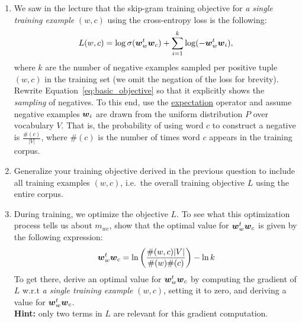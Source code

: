 \documentclass[11pt,a4paper]{article}
\begin{document}
\begin{enumerate}[label=(\alph*)]
    \item We saw in the lecture that the skip-gram training objective for
          \emph{a single training example} $(w,c)$ using the cross-entropy loss
          is the following:
          \begin{align}\label{eq:basic_objective}
              L(w,c) = \log \sigma({\boldsymbol{w}}_w^t{\boldsymbol{w}}_c) + \sum_{i=1}^k \log(-{\boldsymbol{w}}_w^t{\boldsymbol{w}}_i),
          \end{align}
          where $k$ are the number of negative examples sampled per positive
          tuple $(w,c)$ in the training set (we omit the negation of the loss
          for brevity).
          Rewrite Equation~\ref{eq:basic_objective} so that it explicitly shows
          the \emph{sampling} of negatives.
          To this end, use the
          \href{https://en.wikipedia.org/wiki/Expected_value}{\underline{expectation}}
          operator and assume negative examples ${\boldsymbol{w}}_i$ are drawn from the
          uniform distribution $P$ over vocabulary $V$.
          That is, the probability of using word $c$ to construct a negative is
          $\frac{\#(c)}{|V|}$, where $\#(c)$ is the number of times word $c$
          appears in the training corpus.
    \item Generalize your training objective derived in the previous question to
          include all training examples $(w,c)$, i.e.\ the overall training
          objective $L$ using the entire corpus.
    \item During training, we optimize the objective $L$. To see what this
          optimization process tells us about $m_{wc}$, show that the optimal
          value for ${\boldsymbol{w}}_w^t{\boldsymbol{w}}_c$ is given by the following expression:
          \begin{align}\label{eq:pmi_equality}
              {\boldsymbol{w}}_w^t{\boldsymbol{w}}_c = \ln\left(\frac{\#(w,c) |V|}{\#(w) \#(c)}\right) - \ln k
          \end{align}
          To get there, derive an optimal value for ${\boldsymbol{w}}_w^t{\boldsymbol{w}}_c$ by computing
          the gradient of $L$ w.r.t \emph{a single training example} $(w,c)$,
          setting it to zero, and deriving a value for ${\boldsymbol{w}}_w^t{\boldsymbol{w}}_c$. \\
          \textbf{Hint:} only two terms in $L$ are relevant for this gradient
          computation.
\end{enumerate}
\end{document}

